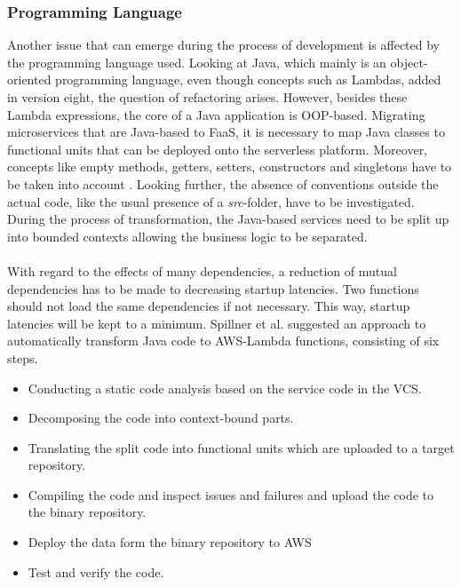 \documentclass[a4paper,twoside,11pt, pagesize]{scrartcl}
\begin{document}
\begin{spacing}{1.2}
\subsubsection{Programming Language}
Another issue that can emerge during the process of development is affected by the programming language used. Looking at Java, which mainly is an object-oriented programming language, even though concepts such as Lambdas, added in version eight, the question of refactoring arises. However, besides these Lambda expressions, the core of a Java application is OOP-based. Migrating microservices that are Java-based to FaaS, it is necessary to map Java classes to functional units that can be deployed onto the serverless platform. Moreover, concepts like empty methods, getters, setters, constructors and singletons have to be taken into account \cite{spillner2017Java}. Looking further, the absence of conventions outside the actual code, like the usual presence of a \textit{src}-folder, have to be investigated. During the process of transformation, the Java-based services need to be split up into bounded contexts allowing the business logic to be separated.\\\\With regard to the effects of many dependencies, a reduction of mutual dependencies has to be made to decreasing startup latencies. Two functions should not load the same dependencies if not necessary. This way, startup latencies will be kept to a minimum. Spillner et al. suggested an approach to automatically transform Java code to AWS-Lambda functions, consisting of six steps.
\begin{itemize}
  \item[1.] Conducting a static code analysis based on the service code in the VCS.
  \item[2.] Decomposing the code into context-bound parts.
  \item[3.] Translating the split code into functional units which are uploaded to a target repository. 
  \item[4.] Compiling the code and inspect issues and failures and upload the code to the binary repository. 
  \item[5.] Deploy the data form the binary repository to AWS
  \item[6.] Test and verify the code.
\end{itemize}

\end{spacing}
\end{document}
